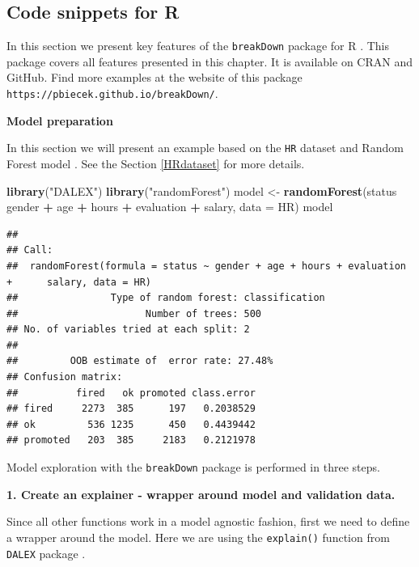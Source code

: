 \documentclass[]{krantz}
\newenvironment{Shaded}{\begin{snugshade}}{\end{snugshade}}
\newcommand{\DataTypeTok}[1]{\textcolor[rgb]{0.13,0.29,0.53}{#1}}
\newcommand{\KeywordTok}[1]{\textcolor[rgb]{0.13,0.29,0.53}{\textbf{#1}}}
\newcommand{\NormalTok}[1]{#1}
\newcommand{\OperatorTok}[1]{\textcolor[rgb]{0.81,0.36,0.00}{\textbf{#1}}}
\newcommand{\StringTok}[1]{\textcolor[rgb]{0.31,0.60,0.02}{#1}}
\theoremstyle{definition}
\theoremstyle{definition}
\theoremstyle{definition}
\theoremstyle{remark}
\begin{document}
\hypertarget{code-snippets-for-r}{%
\subsection{Code snippets for R}\label{code-snippets-for-r}}

In this section we present key features of the \texttt{breakDown}
package for R \citep{R-breakDown}. This package covers all features
presented in this chapter. It is available on CRAN and GitHub. Find more
examples at the website of this package
\texttt{https://pbiecek.github.io/breakDown/}.

\textbf{Model preparation}

In this section we will present an example based on the \texttt{HR}
dataset and Random Forest model \citep{R-randomForest}. See the Section
\ref{HRdataset} for more details.

\begin{Shaded}
\begin{Highlighting}[]
\KeywordTok{library}\NormalTok{(}\StringTok{"DALEX"}\NormalTok{)}
\KeywordTok{library}\NormalTok{(}\StringTok{"randomForest"}\NormalTok{)}
\NormalTok{model <-}\StringTok{ }\KeywordTok{randomForest}\NormalTok{(status }\OperatorTok{~}\StringTok{ }\NormalTok{gender }\OperatorTok{+}\StringTok{ }\NormalTok{age }\OperatorTok{+}\StringTok{ }\NormalTok{hours }\OperatorTok{+}\StringTok{ }\NormalTok{evaluation }\OperatorTok{+}\StringTok{ }\NormalTok{salary, }\DataTypeTok{data =}\NormalTok{ HR)}
\NormalTok{model}
\end{Highlighting}
\end{Shaded}

\begin{verbatim}
## 
## Call:
##  randomForest(formula = status ~ gender + age + hours + evaluation +      salary, data = HR) 
##                Type of random forest: classification
##                      Number of trees: 500
## No. of variables tried at each split: 2
## 
##         OOB estimate of  error rate: 27.48%
## Confusion matrix:
##          fired   ok promoted class.error
## fired     2273  385      197   0.2038529
## ok         536 1235      450   0.4439442
## promoted   203  385     2183   0.2121978
\end{verbatim}

Model exploration with the \texttt{breakDown} package is performed in
three steps.

\textbf{1. Create an explainer - wrapper around model and validation
data.}

Since all other functions work in a model agnostic fashion, first we
need to define a wrapper around the model. Here we are using the
\texttt{explain()} function from \texttt{DALEX} package \citep{R-DALEX}.
\end{document}
